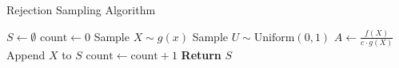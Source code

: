 \begin{algorithm}
\caption{Rejection Sampling Algorithm}
\begin{algorithmic}[1]
\State \( S \leftarrow \emptyset \)
\State \( \text{count} \leftarrow 0 \)
    \State Sample \( X \sim g(x) \) 
    \State Sample \( U \sim \text{Uniform}(0, 1) \) 
    \State \( A \leftarrow \frac{f(X)}{c \cdot g(X)} \) 
        \State Append \( X \) to \( S \)
        \State \( \text{count} \leftarrow \text{count} + 1 \)
    \EndIf
\EndWhile
\State \textbf{Return} \( S \)
\end{algorithmic}
\label{rejection}
\end{algorithm}